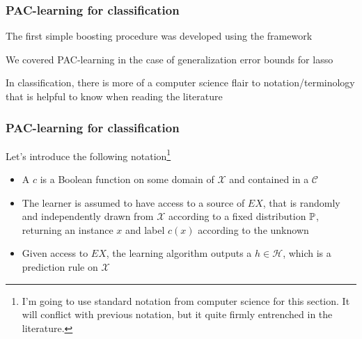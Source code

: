\documentclass[12pt]{beamer}
\begin{document}
\begin{frame}[fragile]
\frametitle{PAC-learning for classification}
The first simple boosting procedure was developed using the  framework

\vsp
We covered PAC-learning in the case of generalization error bounds for lasso

\vsp
In classification, there is more of a computer science flair to notation/terminology that is helpful to know
when reading the literature
\end{frame}

\begin{frame}[fragile]
\frametitle{PAC-learning for classification}
Let's introduce the following notation\footnote{I'm going to use standard notation from computer science
for this section.  It will conflict with previous notation, but it quite firmly entrenched in the literature.}
\begin{itemize}
\item A  $c$ is a Boolean function on some domain of  $\mathcal{X}$
and contained in a  $\mathcal{C}$


\item The learner is assumed to have access to a source of  $EX$, that is randomly
and independently drawn from $\mathcal{X}$ according to a fixed distribution $\P$, returning an instance $x$
and label $c(x)$ according to the unknown 

\item Given access to $EX$, the learning algorithm outputs a  $h \in \mathcal{H}$, which is a 
prediction rule on $\mathcal{X}$
\end{itemize}
\end{frame}

%
\end{document}
